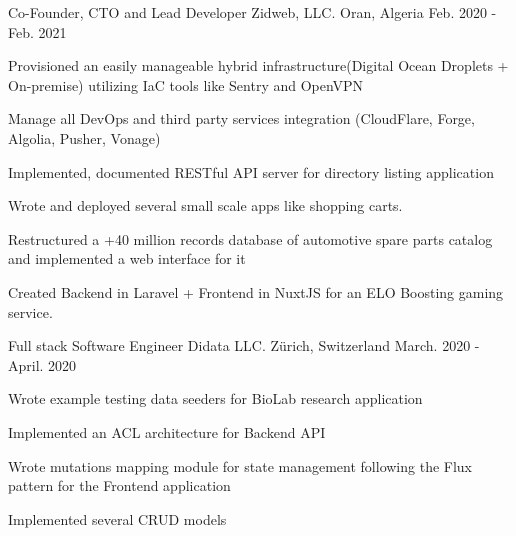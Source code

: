 \begin{cventries}
  \cventry
    {Co-Founder, CTO and Lead Developer} %
    {Zidweb, LLC.} %
    {Oran, Algeria} %
    {Feb. 2020 - Feb. 2021} %
    {
      \begin{cvitems} %
        \item {Provisioned an easily manageable hybrid infrastructure(Digital Ocean Droplets + On-premise) utilizing IaC tools like Sentry and OpenVPN}
        \item {Manage all DevOps and third party services integration (CloudFlare, Forge, Algolia, Pusher, Vonage)}
        \item {Implemented, documented RESTful API server for directory listing application}
        \item {Wrote and deployed several small scale apps like shopping carts.}
        \item {Restructured a +40 million records database of automotive spare parts catalog and implemented a web interface for it}
        \item {Created Backend in Laravel + Frontend in NuxtJS for an ELO Boosting gaming service.}
      \end{cvitems}
    }

  \cventry
    {Full stack Software Engineer} %
    {Didata LLC.} %
    {Zürich, Switzerland} %
    {March. 2020 - April. 2020} %
    {
      \begin{cvitems} %
        \item {Wrote example testing data seeders for BioLab research application}
        \item {Implemented an ACL architecture for Backend API}
        \item {Wrote mutations mapping module for state management following the Flux pattern for the Frontend application}
        \item {Implemented several CRUD models}
      \end{cvitems}
    }

\end{cventries}
